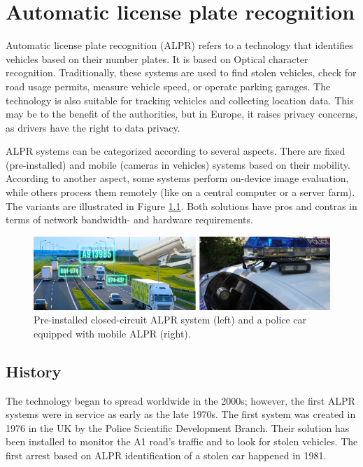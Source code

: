 \chapter{Automatic license plate recognition}

Automatic license plate recognition (ALPR) refers to a technology that identifies vehicles based on their number plates. It is based on Optical character recognition. Traditionally, these systems are used to find stolen vehicles, check for road usage permits, measure vehicle speed, or operate parking garages. The technology is also suitable for tracking vehicles and collecting location data. This may be to the benefit of the authorities, but in Europe, it raises privacy concerns, as drivers have the right to data privacy.

ALPR systems can be categorized according to several aspects. There are fixed (pre-installed) and mobile (cameras in vehicles) systems based on their mobility. According to another aspect, some systems perform on-device image evaluation, while others process them remotely (like on a central computer or a server farm). The variants are illustrated in Figure \ref{fig:alpr-systems}. Both solutions have pros and contras in terms of network bandwidth- and hardware requirements.

\begin{figure}[htb]
 \centerline{\includegraphics[width=1.0\columnwidth]{.//Figure/ALPR/alpr-systems.png}}
 \caption{Pre-installed closed-circuit ALPR system\cite{ImageFixedALPR} (left) and a police car equipped with mobile ALPR\cite{ImageMobileALPR} (right).}
 \label{fig:alpr-systems}
\end{figure}

\section{History}

The technology began to spread worldwide in the 2000s; however, the first ALPR systems were in service as early as the late 1970s. The first system was created in 1976 in the UK by the Police Scientific Development Branch. Their solution has been installed to monitor the A1 road's traffic and to look for stolen vehicles. The first arrest based on ALPR identification of a stolen car happened in 1981\cite{ANPR_history}.

